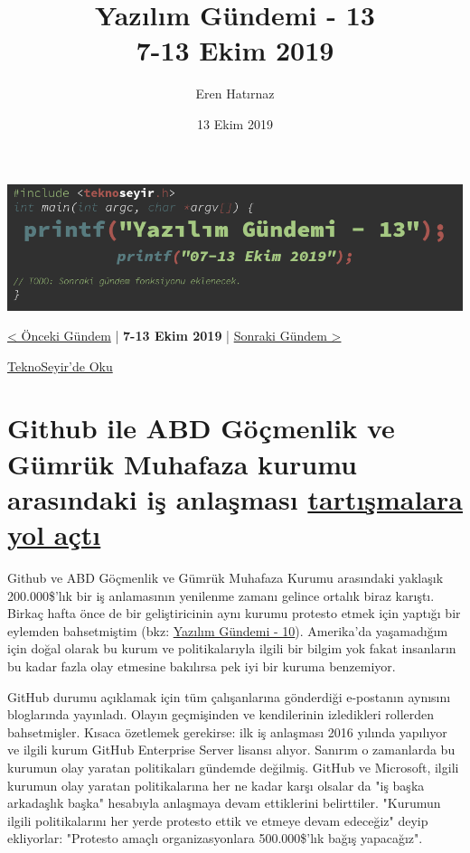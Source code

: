\documentclass[11pt]{article}
\author{Eren Hatırnaz}
\date{13 Ekim 2019}
\title{Yazılım Gündemi - 13\\\medskip
\large 7-13 Ekim 2019}
\begin{document}
\maketitle
\tableofcontents \clearpage\shorthandoff{=}

\begin{center}
\includegraphics[width=.9\linewidth]{gorseller/yazilim-gundemi-banner.png}
\end{center}

\begin{center}
\href{../12/yazilim-gundemi-12.pdf}{< Önceki Gündem} | \textbf{7-13 Ekim 2019} | \href{../14/yazilim-gundemi-14.pdf}{Sonraki Gündem >}

\href{https://teknoseyir.com/blog/yazilim-gundemi-13-07-13-ekim-2019}{TeknoSeyir'de Oku}
\end{center}

\section{Github ile ABD Göçmenlik ve Gümrük Muhafaza kurumu arasındaki iş anlaşması \href{https://github.blog/2019-10-09-github-and-us-government-developers/}{tartışmalara yol açtı}}
\label{sec:orge845ac2}
Github ve ABD Göçmenlik ve Gümrük Muhafaza Kurumu arasındaki yaklaşık
200.000\$'lık bir iş anlamasının yenilenme zamanı gelince ortalık biraz karıştı.
Birkaç hafta önce de bir geliştiricinin aynı kurumu protesto etmek için yaptığı
bir eylemden bahsetmiştim (bkz: \href{../10/yazilim-gundemi-10.pdf}{Yazılım Gündemi - 10}). Amerika'da yaşamadığım
için doğal olarak bu kurum ve politikalarıyla ilgili bir bilgim yok fakat
insanların bu kadar fazla olay etmesine bakılırsa pek iyi bir kuruma
benzemiyor.

GitHub durumu açıklamak için tüm çalışanlarına gönderdiği e-postanın aynısını
bloglarında yayınladı. Olayın geçmişinden ve kendilerinin izledikleri rollerden
bahsetmişler. Kısaca özetlemek gerekirse: ilk iş anlaşması 2016 yılında
yapılıyor ve ilgili kurum GitHub Enterprise Server lisansı alıyor. Sanırım o
zamanlarda bu kurumun olay yaratan politikaları gündemde değilmiş. GitHub ve
Microsoft, ilgili kurumun olay yaratan politikalarına her ne kadar karşı
olsalar da "iş başka arkadaşlık başka" hesabıyla anlaşmaya devam ettiklerini
belirttiler. "Kurumun ilgili politikalarını her yerde protesto ettik ve etmeye
devam edeceğiz" deyip ekliyorlar: "Protesto amaçlı organizasyonlara
500.000\$'lık bağış yapacağız".
\end{document}
